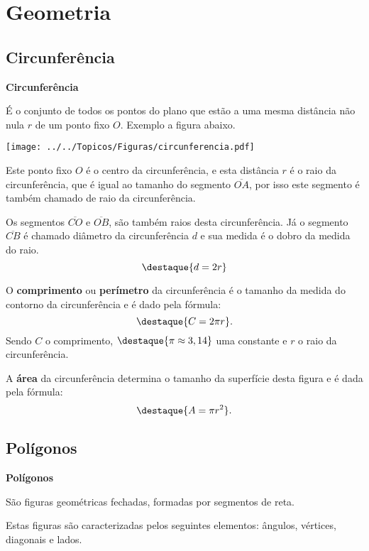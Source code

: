 \chapter{Geometria}
\section{Circunferência}

\vskip0.3cm

\colorbox{azul}{
 \begin{minipage}{0.9\linewidth}
 \begin{center}
 \textbf{Circunferência}

  É o conjunto de todos os pontos do plano que estão a uma mesma distância não nula $r$ de um ponto fixo $O$. Exemplo a figura abaixo.
 \end{center}
 \end{minipage}}

 \vskip0.3cm

 \begin{center}
 \texttt{[image: ../../Topicos/Figuras/circunferencia.pdf]}
 \end{center}

Este ponto fixo $O$ é o centro da circunferência, e esta distância $r$ é o raio da circunferência, que é igual ao tamanho do segmento $\overline{OA}$, por isso este segmento é também chamado de raio da circunferência.

Os segmentos $\overline{CO}$ e $\overline{OB}$, são também raios desta circunferência. Já o segmento $\overline{CB}$ é chamado diâmetro da circunferência $d$ e sua medida é o dobro da medida do raio.
\[\destaque{d= 2r}\]

O \textbf{comprimento} ou \textbf{perímetro} da circunferência é o tamanho da medida do contorno da circunferência e é dado pela fórmula:
\[\destaque{C= 2 \pi r} .\]
Sendo $C$ o comprimento, $\destaque{\pi \approx 3,14}$ uma constante e $r$ o raio da circunferência.

A \textbf{área} da circunferência determina o tamanho da superfície desta figura e é dada pela fórmula:
\[\destaque{A= \pi r^2} .\]


\section{Polígonos}

\vskip0.3cm

\colorbox{azul}{
 \begin{minipage}{0.9\linewidth}
 \begin{center}
 \textbf{Polígonos}

  São figuras geométricas fechadas, formadas por segmentos de reta.

  Estas figuras são caracterizadas pelos seguintes elementos: ângulos, vértices, diagonais e lados.
 \end{center}
 \end{minipage}}

